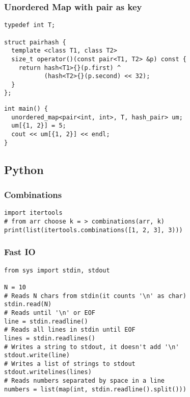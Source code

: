 \documentclass[twoside]{article}
\begin{document}
\begin{multicols*}{2}
\subsubsection*{Unordered Map with pair as key}
\begin{verbatim}
typedef int T;

struct pairhash {
  template <class T1, class T2>
  size_t operator()(const pair<T1, T2> &p) const {
    return hash<T1>{}(p.first) ^
           (hash<T2>{}(p.second) << 32);
  }
};
\end{verbatim}
\vspace{-12pt}
\begin{verbatim}
int main() {
  unordered_map<pair<int, int>, T, hash_pair> um;
  um[{1, 2}] = 5;
  cout << um[{1, 2}] << endl;
}
\end{verbatim}

\subsectionfont{\bfseries\sffamily\centering\LARGE}
\vspace{0em}
\subsection*{Python}
\vspace{2em}
\subsubsectionfont{\large\bfseries\sffamily\underline}
\subsubsection*{Combinations}
\begin{verbatim}
import itertools
# from arr choose k = > combinations(arr, k)
print(list(itertools.combinations([1, 2, 3], 3)))
\end{verbatim}

\subsubsectionfont{\large\bfseries\sffamily\underline}
\subsubsection*{Fast IO}
\begin{verbatim}
from sys import stdin, stdout

N = 10
# Reads N chars from stdin(it counts '\n' as char)
stdin.read(N)
# Reads until '\n' or EOF
line = stdin.readline()
# Reads all lines in stdin until EOF
lines = stdin.readlines()
# Writes a string to stdout, it doesn't add '\n'
stdout.write(line)
# Writes a list of strings to stdout
stdout.writelines(lines)
# Reads numbers separated by space in a line
numbers = list(map(int, stdin.readline().split()))


\end{verbatim}
\end{multicols*}
\end{document}
